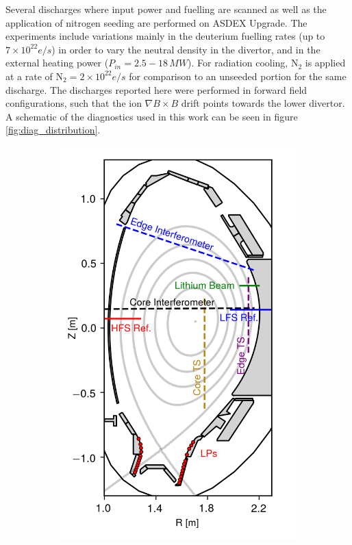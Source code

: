 \documentclass[12pt]{iopart}
\begin{document}
Several discharges where input power and fuelling are scanned as well as the application of nitrogen seeding are performed on ASDEX Upgrade. The experiments include variations mainly in the deuterium fuelling rates (up to $7\times 10^{22}e/s$) in order to vary the neutral density in the divertor, and in the external heating power ($P_{in} = 2.5-18\,MW$). For radiation cooling, $\mathrm{N_{2}}$ is applied at a rate of $\mathrm{N_{2}} = 2\times 10^{22}e/s$ for comparison to an unseeded portion for the same discharge. The discharges reported here were performed in forward field configurations, such that the ion $\nabla B\times B$ drift points towards the lower divertor. A schematic of the diagnostics used in this work can be seen in figure \ref{fig:diag_distribution}.

\begin{figure}[!hbt]
\centering
	\begin{subfigure}{3in}
    \includegraphics{dens_diags.png}

\end{subfigure}
\end{figure}
\end{document}
